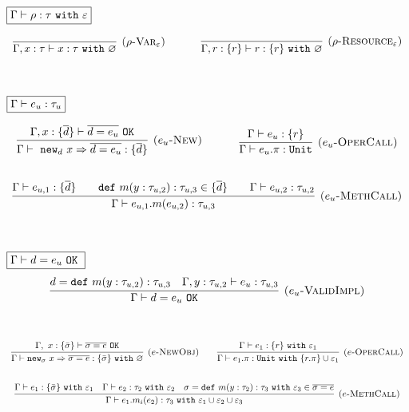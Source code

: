 \documentclass{llncs}
\newcommand{\keywadj}[1]{\mathtt{#1}}
\newcommand{\keyw}[1]{\keywadj{#1}~}
\newcommand{\kwa}[1]{\keywadj{ #1 }}
\newcommand{\type}[2]{
	#1~\keyw{with} #2
}
\begin{document}
\noindent
$\fbox{$\Gamma \vdash \rho : \type{\tau}{\varepsilon}$}$

\[
\begin{array}{c}

\infer[\textsc{($\rho$-Var$_\varepsilon$)}]
	{\Gamma, x : \tau \vdash x : \type{\tau}{\varnothing}}
	{}
~~~~~~~~~~
\infer[\textsc{($\rho$-Resource$_\varepsilon$)}]
	{\Gamma, r : \{ r \} \vdash r : \type{\{ r \}}{\varnothing}}
	{} \\[6ex]

\end{array}
\]

\noindent
$\fbox{$\Gamma \vdash e_u : \tau_u$}$

\[
\begin{array}{c}
\infer[\textsc{($e_u$-New)}]
	{\Gamma \vdash~\kwa{new}_d~x \Rightarrow \overline{ d = e_u } : \{ \overline{d} \}}
	{\Gamma, x : \{ \overline{d} \} \vdash \overline{d = e_u}~\keywadj{OK}}
~~~~~~~~~~
\infer[\textsc{($e_u$-OperCall)}]
	{\Gamma \vdash e_u.\pi : \keywadj{Unit}}
	{\Gamma \vdash e_u : \{ r \}} \\[5ex]

\infer[\textsc{($e_u$-MethCall)}]
	{\Gamma \vdash e_{u, 1}.m(e_{u, 2}) : \tau_{u, 3}}
	{\Gamma \vdash e_{u, 1} : \{ \overline{ d }\} &~~~ \keyw{def} m(y : \tau_{u, 2}) : \tau_{u, 3} \in \{ \overline{d} \} &~~~  \Gamma \vdash e_{u, 2} : \tau_{u, 2} }\\[6ex]

\end{array}
\]

\noindent
$\fbox{$\Gamma \vdash d = e_u~\keyw{OK}$}$
\[
\begin{array}{c}
\infer[\textsc{($e_u$-ValidImpl)}]
	{\Gamma \vdash d = e_u~\keywadj{OK}}
	{d = \keyw{def} m(y : \tau_{u, 2}) : \tau_{u, 3} & \Gamma, y : \tau_{u, 2} \vdash e_u : \tau_{u, 3}}
	\\[5ex]
\end{array}
\]

\noindent
\fbox{$\Gamma \vdash e : \tau~\keyw{with} \varepsilon$}

\[
\begin{array}{c}

\infer[\textsc{($e$-NewObj)}]
	{\Gamma \vdash \kwa{new}_\sigma~x \Rightarrow \overline{\sigma = e} : \{ \bar \sigma \}~\keyw{with} \varnothing}
	{\Gamma,~x : \{ \bar \sigma \} \vdash \overline{\sigma = e}~\keywadj{OK}} ~~~~~~

\infer[\textsc{($e$-OperCall)}]
	{\Gamma \vdash e_1.\pi : \keyw{Unit} \keyw{with} \{ r.\pi \} \cup \varepsilon_1}
	{\Gamma \vdash e_1 : \{ r \}~ \keyw{with} \varepsilon_1} \\[5ex]
	
\infer[\textsc{($e$-MethCall)}]
	{\Gamma \vdash e_{1}.m_i(e_{2}):\tau_{3}~\keyw{with} \varepsilon_1 \cup \varepsilon_2 \cup \varepsilon_3}
	{\Gamma \vdash e_{1} : \{ \bar \sigma \}~\keyw{with} \varepsilon_1 & \Gamma \vdash e_{2} : \tau_{2}~\keyw{with} \varepsilon_2 & \sigma = \keyw{def} m(y:\tau_{2}):\tau_{3}~\keyw{with} \varepsilon_3 \in \overline{\sigma = e}} \\[5ex]
\end{array}
\]
\end{document}
